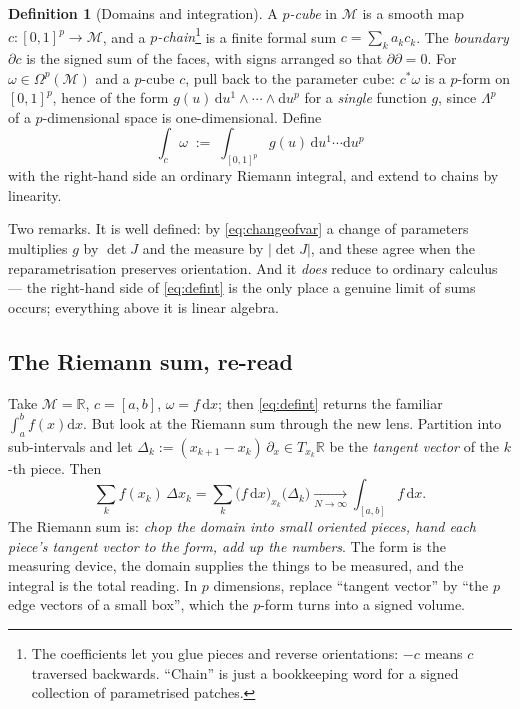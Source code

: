 \documentclass[10pt,a4paper]{article}
\newcommand{\dd}{\mathrm{d}}
\newcommand{\R}{\mathbb{R}}
\newcommand{\M}{\mathcal{M}}
\newcommand{\Om}{\Omega}
\theoremstyle{plain}
\theoremstyle{definition}
\newtheorem{defn}[thm]{Definition}
\numberwithin{equation}{section}
\begin{document}
\begin{defn}[Domains and integration]\label{def:int}
A \emph{$p$-cube} in $\M$ is a smooth map $c:[0,1]^p\to\M$, and a \emph{$p$-chain}\footnote{The
coefficients let you glue pieces and reverse orientations: $-c$ means $c$ traversed backwards.
``Chain'' is just a bookkeeping word for a signed collection of parametrised patches.} is a
finite formal sum $c=\sum_ka_kc_k$. The \emph{boundary} $\partial c$ is the signed sum of the
faces, with signs arranged so that $\partial\partial=0$. For $\omega\in\Om^p(\M)$ and a
$p$-cube $c$, pull back to the parameter cube: $c^*\omega$ is a $p$-form on $[0,1]^p$, hence of
the form $g(u)\,\dd u^1\wedge\cdots\wedge\dd u^p$ for a \emph{single} function $g$, since
$\Lambda^p$ of a $p$-dimensional space is one-dimensional. Define
\begin{equation}
\boxed{\ \int_c\omega\;:=\;\int_{[0,1]^p}g(u)\,\dd u^1\cdots\dd u^p\ }
\label{eq:defint}
\end{equation}
with the right-hand side an ordinary Riemann integral, and extend to chains by linearity.
\end{defn}

\noindent Two remarks. It is well defined: by \eqref{eq:changeofvar} a change of parameters
multiplies $g$ by $\det J$ and the measure by $|\det J|$, and these agree when the
reparametrisation preserves orientation. And it \emph{does} reduce to ordinary calculus --- the
right-hand side of \eqref{eq:defint} is the only place a genuine limit of sums occurs;
everything above it is linear algebra.

\subsection{The Riemann sum, re-read}

Take $\M=\R$, $c=[a,b]$, $\omega=f\,\dd x$; then \eqref{eq:defint} returns the familiar
$\int_a^bf(x)\dd x$. But look at the Riemann sum through the new lens. Partition into
sub-intervals and let $\Delta_k:=(x_{k+1}-x_k)\,\partial_x\in T_{x_k}\R$ be the \emph{tangent
vector} of the $k$-th piece. Then
\begin{equation}
\sum_kf(x_k)\,\Delta x_k=\sum_k\big(f\,\dd x\big)_{x_k}\!\big(\Delta_k\big)
\xrightarrow[N\to\infty]{}\int_{[a,b]}f\,\dd x .
\label{eq:riemannsum}
\end{equation}
The Riemann sum is: \emph{chop the domain into small oriented pieces, hand each piece's tangent
vector to the form, add up the numbers}. The form is the measuring device, the domain supplies
the things to be measured, and the integral is the total reading. In $p$ dimensions, replace
``tangent vector'' by ``the $p$ edge vectors of a small box'', which the $p$-form turns into a
signed volume.
\end{document}
